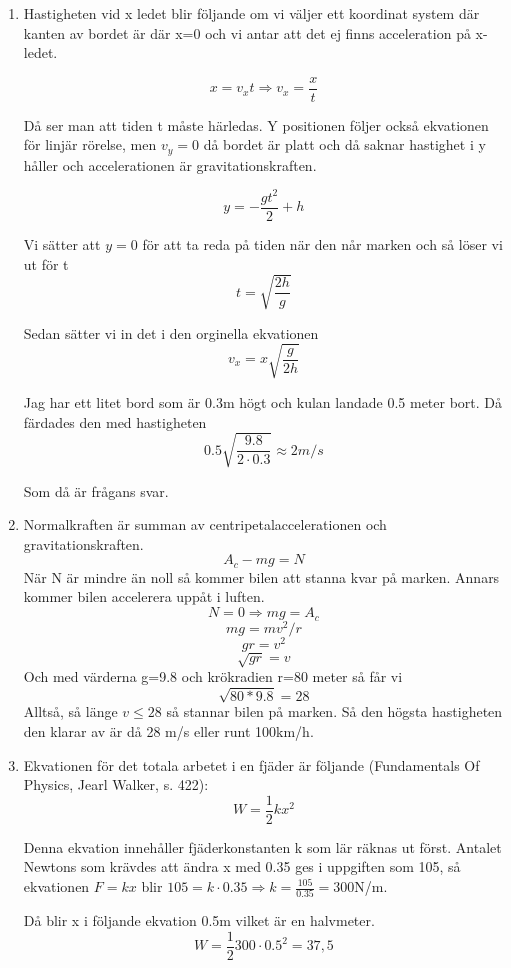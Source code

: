\documentclass[a4paper,12pt]{article}
\begin{document}
\begin{enumerate}
    \item Hastigheten vid x ledet blir följande om vi väljer ett 
    koordinat system där kanten av bordet är där x=0 och vi antar att 
    det ej finns acceleration på x-ledet.

    $$x=v_xt\Rightarrow v_x=\frac{x}{t}$$
    
    Då ser man att tiden t måste härledas.
    Y positionen följer också ekvationen för linjär rörelse, men 
    $v_{y}=0$ då bordet är platt och då saknar hastighet i
    y håller och accelerationen är gravitationskraften.

    $$y=-\frac{gt^2}{2}+h$$

    Vi sätter att $y=0$ för att ta reda på tiden
    när den når marken och så löser vi ut för t
    $$t=\sqrt{\frac{2h}{g}}$$

    Sedan sätter vi in det i den orginella ekvationen
    $$v_x=x\sqrt{\frac{g}{2h}}$$

    Jag har ett litet bord som är 0.3m högt och kulan landade 0.5 meter bort. 
    Då färdades den med hastigheten 
    $$0.5\sqrt{\frac{9.8}{2\cdot 0.3}}\approx 2 m/s$$

    Som då är frågans svar.

    \item Normalkraften är summan av centripetalaccelerationen och gravitationskraften.
          $$A_c-mg=N$$
          När N är mindre än noll så kommer bilen att stanna kvar på marken. Annars
          kommer bilen accelerera uppåt i luften.
          $$N=0 \Rightarrow mg=A_c$$
          $$mg=mv^2/r$$
          $$gr=v^2$$
          $$\sqrt{gr}=v$$
          Och med värderna g=9.8 och krökradien r=80 meter så får vi
          $$\sqrt{80*9.8}=28$$
          Alltså, så länge $v\leq 28$ så stannar bilen på marken. Så den högsta
          hastigheten den klarar av är då 28 m/s eller runt 100km/h.

    \item Ekvationen för det totala arbetet i en fjäder är följande (Fundamentals Of Physics, Jearl Walker, s. 422):
    $$W=\frac{1}{2}kx^2$$
    
    Denna ekvation innehåller fjäderkonstanten k som lär räknas ut först.
    Antalet Newtons som krävdes att ändra x med 0.35 
    ges i uppgiften som 105, så ekvationen $F=kx$ 
    blir $105=k\cdot 0.35\Rightarrow k=\frac{105}{0.35}=300$N/m.

    Då blir x i följande ekvation 0.5m vilket är en halvmeter. 
    $$W=\frac{1}{2}300\cdot 0.5^2=37,5$$


\end{enumerate}
\end{document}

